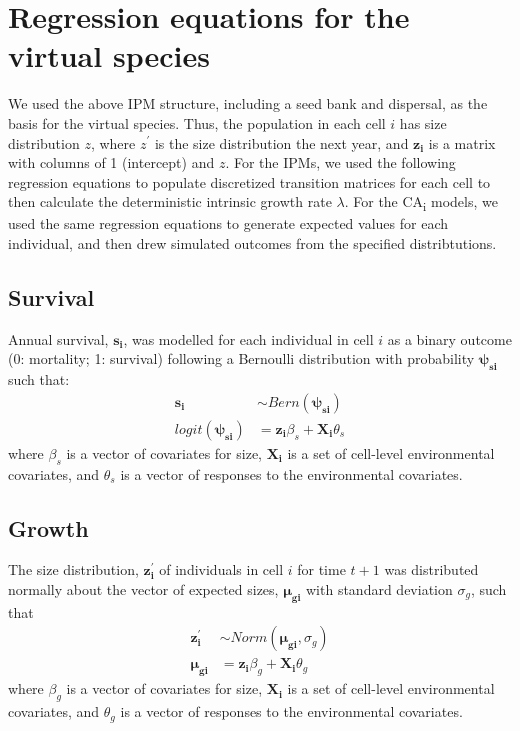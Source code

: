 \documentclass[]{article}
\begin{document}
\newpage
\section{Regression equations for the virtual species}

We used the above IPM structure, including a seed bank and dispersal, as
the basis for the virtual species. Thus, the population in each cell
\(i\) has size distribution \(z\), where \(z^{\prime}\) is the size
distribution the next year, and \(\boldsymbol{z_i}\) is a matrix with
columns of 1 (intercept) and \(z\). For the IPMs, we used the following
regression equations to populate discretized transition matrices for
each cell to then calculate the deterministic intrinsic growth rate
\(\lambda\). For the CA\textsubscript{i} models, we used the same
regression equations to generate expected values for each individual,
and then drew simulated outcomes from the specified distribtutions.

\subsection{Survival}

Annual survival, \(\boldsymbol{s_i}\), was modelled for each individual
in cell \(i\) as a binary outcome (0: mortality; 1: survival) following
a Bernoulli distribution with probability \(\boldsymbol{\psi_{si}}\)
such that: \begin{align}
\boldsymbol{s_i} & \sim Bern(\boldsymbol{\psi_{si}}) \\
logit(\boldsymbol{\psi_{si}}) & = \boldsymbol{z_i}\beta_{s} + \boldsymbol{X_i}\theta_{s}
\end{align} where \(\beta_{s}\) is a vector of covariates for size,
\(\boldsymbol{X_i}\) is a set of cell-level environmental covariates,
and \(\theta_{s}\) is a vector of responses to the environmental
covariates.

\subsection{Growth}

The size distribution, \(\boldsymbol{z^{\prime}_i}\) of individuals in
cell \(i\) for time \(t+1\) was distributed normally about the vector of
expected sizes, \(\boldsymbol{\mu_{gi}}\) with standard deviation
\(\sigma_g\), such that \begin{align}
\boldsymbol{z^{\prime}_i} &\sim Norm(\boldsymbol{\mu_{gi}}, \sigma_g) \\
\boldsymbol{\mu_{gi}} &= \boldsymbol{z_i}\beta_{g} + \boldsymbol{X_i}\theta_{g}
\end{align} where \(\beta_{g}\) is a vector of covariates for size,
\(\boldsymbol{X_i}\) is a set of cell-level environmental covariates,
and \(\theta_{g}\) is a vector of responses to the environmental
covariates.
\end{document}
